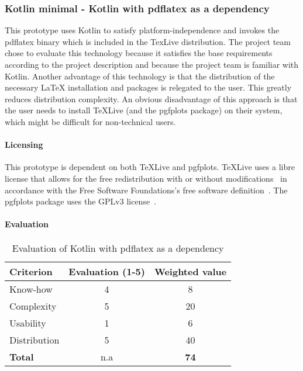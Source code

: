 \subsubsection{Kotlin minimal - Kotlin with pdflatex as a dependency}
\label{subsubsec:kotlin_minimal}
This prototype uses Kotlin to satisfy platform-independence and invokes the pdflatex binary which is included in the TexLive distribution.
The project team chose to evaluate this technology because it satisfies the base requirements according to the project description and because
the project team is familiar with Kotlin.
Another advantage of this technology is that the distribution of the necessary LaTeX installation and packages is relegated to the user.
This greatly reduces distribution complexity.\newline
An obvious disadvantage of this approach is that the user needs to install TeXLive (and the pgfplots package) on their system, which might be difficult for non-technical users.

\paragraph{Licensing}\mbox{}\newline
This prototype is dependent on both TeXLive and pgfplots.
TeXLive uses a libre license that allows for the free redistribution with or without modifications~\cite{texlive_license} in accordance with the Free Software Foundations's free software definition~\cite{fsf_free_software}.
The pgfplots package uses the GPLv3 license~\cite{pgfplots}.

\paragraph{Evaluation}\mbox{}\newline
\begin{table}[H]
    \centering
    \begin{tabular}{|l|c|c|}
        \hline
        \textbf{Criterion} & \textbf{Evaluation (1-5)} & \textbf{Weighted value} \\
        \hline
        Know-how & 4 & 8 \\
        \hline
        Complexity & 5 & 20 \\
        \hline
        Usability & 1 & 6 \\
        \hline
        Distribution & 5 & 40 \\
        \hline
        \textbf{Total} & n.a & \textbf{74} \\
        \hline
    \end{tabular}
    \caption{Evaluation of Kotlin with pdflatex as a dependency}
    \label{table:kotlin_minimal_evaluation}
\end{table}

